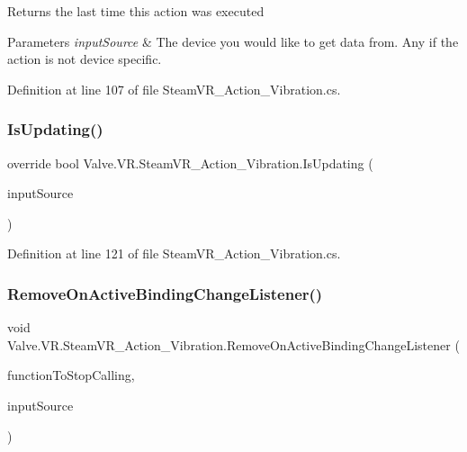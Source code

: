 Returns the last time this action was executed 


\begin{DoxyParams}{Parameters}
{\em input\+Source} & The device you would like to get data from. Any if the action is not device specific.\\
\hline
\end{DoxyParams}


Definition at line 107 of file Steam\+V\+R\+\_\+\+Action\+\_\+\+Vibration.\+cs.

\mbox{\label{class_valve_1_1_v_r_1_1_steam_v_r___action___vibration_a1dd64911f3d1caa2b78123bd178b0f7b}} 
\subsubsection{\texorpdfstring{IsUpdating()}{IsUpdating()}}
{\footnotesize\ttfamily override bool Valve.\+V\+R.\+Steam\+V\+R\+\_\+\+Action\+\_\+\+Vibration.\+Is\+Updating (\begin{DoxyParamCaption}\item[{\mbox{\hyperlink{namespace_valve_1_1_v_r_a82e5bf501cc3aa155444ee3f0662853f}{Steam\+V\+R\+\_\+\+Input\+\_\+\+Sources}}}]{input\+Source }\end{DoxyParamCaption})}



Definition at line 121 of file Steam\+V\+R\+\_\+\+Action\+\_\+\+Vibration.\+cs.

\mbox{\label{class_valve_1_1_v_r_1_1_steam_v_r___action___vibration_a2f792bbebfd9c63d77a0c220bf2f22c0}} 
\subsubsection{\texorpdfstring{RemoveOnActiveBindingChangeListener()}{RemoveOnActiveBindingChangeListener()}}
{\footnotesize\ttfamily void Valve.\+V\+R.\+Steam\+V\+R\+\_\+\+Action\+\_\+\+Vibration.\+Remove\+On\+Active\+Binding\+Change\+Listener (\begin{DoxyParamCaption}\item[{\mbox{\hyperlink{class_valve_1_1_v_r_1_1_steam_v_r___action___vibration_a7706b3c9b71de3bea16a3fab8a882f0b}{Active\+Change\+Handler}}}]{function\+To\+Stop\+Calling,  }\item[{\mbox{\hyperlink{namespace_valve_1_1_v_r_a82e5bf501cc3aa155444ee3f0662853f}{Steam\+V\+R\+\_\+\+Input\+\_\+\+Sources}}}]{input\+Source }\end{DoxyParamCaption})}



